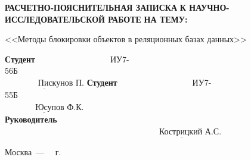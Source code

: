 \begin{titlepage}
	\begin{center}
		\Large\textbf{РАСЧЕТНО-ПОЯСНИТЕЛЬНАЯ ЗАПИСКА}
		\Large\textbf{К НАУЧНО-ИССЛЕДОВАТЕЛЬСКОЙ РАБОТЕ}
		\Large\textbf{НА ТЕМУ:}
	\end{center}
	
	\begin{center}
		\fontsize{18pt}{0.6cm}\selectfont 
		
		<<Методы блокировки объектов в реляционных базах данных>>
		
	\end{center}
	\vfill
	
	\noindent\textbf{Студент}~~~~~~~~~~~~~~~~~~ИУ7-56Б~~~~~~~~~~~~~~~~~~~~~~~~~~~~~~~~~~~~~~~~~~~~~~~~~~~~~~~~~~~~~~$\underline{\text{~~~~~~~~~~~~Пискунов П.}}$\newline\newline
	\noindent\textbf{Студент}~~~~~~~~~~~~~~~~~~ИУ7-55Б~~~~~~~~~~~~~~~~~~~~~~~~~~~~~~~~~~~~~~~~~~~~~~~~~~~~~~~~~~~~~~~~$\underline{\text{~~~~~~~~~~~Юсупов Ф.К.}}$\newline\newline
	\noindent\textbf{Руководитель}~~~~~~~~~~~~~~~~~~~~~~~~~~~~~~~~~~~~~~~~~~~~~~~~~~~~~~~~~~~~~~~~~~~~~~~~~~~~~~~~~~~~~~~~~~~~$\underline{\text{~~~~~~Кострицкий А.С.}}$\newline
	
	\begin{center}
		\vfill
		Москва~---~\the\year
		~г.
	\end{center}
	\restoregeometry
	
\end{titlepage}
